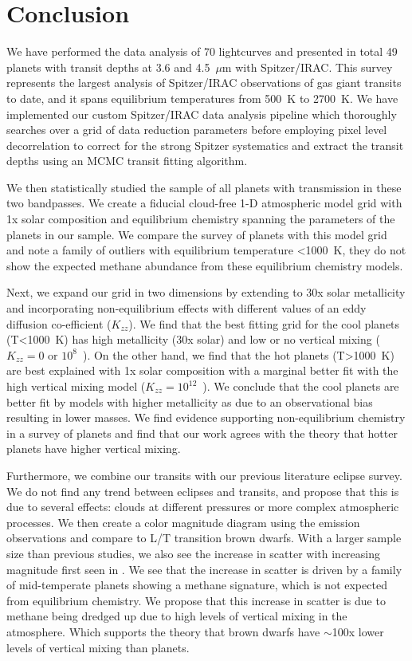 \section{Conclusion}
\label{P1:sec:conclusion}

We have performed the data analysis of 70 lightcurves and presented in total 49 planets with transit depths at 3.6 and 4.5~$\mu$m with Spitzer/IRAC. This survey represents the largest analysis of Spitzer/IRAC observations of gas giant transits to date, and it spans equilibrium temperatures from 500~K to 2700~K. We have implemented our custom Spitzer/IRAC data analysis pipeline which thoroughly searches over a grid of data reduction parameters before employing pixel level decorrelation \citep{Deming2015} to correct for the strong Spitzer systematics and extract the transit depths using an MCMC transit fitting algorithm.

We then statistically studied the sample of all planets with transmission in these two bandpasses. We create a fiducial cloud-free 1-D atmospheric model grid with 1x solar composition and equilibrium chemistry spanning the parameters of the planets in our sample. We compare the survey of planets with this model grid and note a family of outliers with equilibrium temperature <1000~K, they do not show the expected methane abundance from these equilibrium chemistry models.

Next, we expand our grid in two dimensions by extending to 30x solar metallicity and incorporating non-equilibrium effects with different values of an eddy diffusion co-efficient ($K_{zz}$). We find that the best fitting grid for the cool planets (T<1000~K) has high metallicity (30x solar) and low or no vertical mixing ($K_{zz}=0$ or $10^8$~\cmcms). On the other hand, we find that the hot planets (T>1000~K) are best explained with 1x solar composition with a marginal better fit with the high vertical mixing model ($K_{zz}=10^{12}$~\cmcms). We conclude that the cool planets are better fit by models with higher metallicity as due to an observational bias resulting in lower masses. We find evidence supporting non-equilibrium chemistry in a survey of planets and find that our work agrees with the theory that hotter planets have higher vertical mixing.

Furthermore, we combine our transits with our previous literature eclipse survey. We do not find any trend between eclipses and transits, and propose that this is due to several effects: clouds at different pressures or more complex atmospheric processes. We then create a color magnitude diagram using the emission observations and compare to L/T transition brown dwarfs. With a larger sample size than previous studies, we also see the increase in scatter with increasing magnitude first seen in \citet{Triaud2014c}. We see that the increase in scatter is driven by a family of mid-temperate planets showing a methane signature, which is not expected from equilibrium chemistry. We propose that this increase in scatter is due to methane being dredged up due to high levels of vertical mixing in the atmosphere. Which supports the theory that brown dwarfs have $\sim$100x lower levels of vertical mixing than planets.


